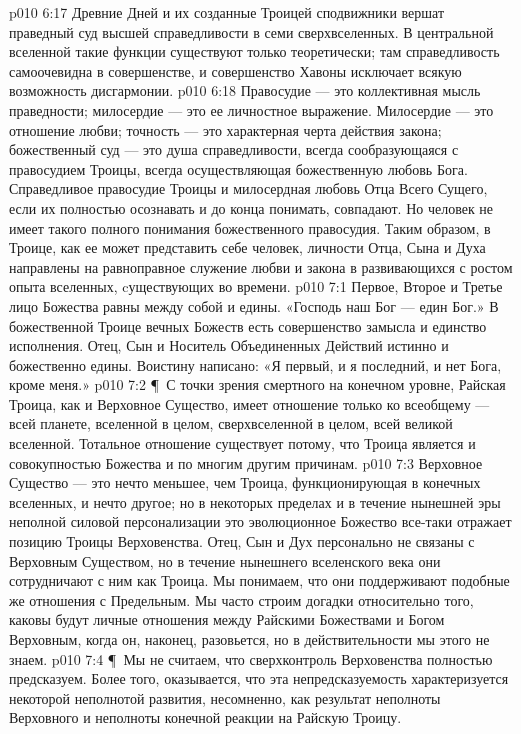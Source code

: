 \vs p010 6:17 Древние Дней и их созданные Троицей сподвижники вершат праведный суд высшей справедливости в семи сверхвселенных. В центральной вселенной такие функции существуют только теоретически; там справедливость самоочевидна в совершенстве, и совершенство Хавоны исключает всякую возможность дисгармонии.
\vs p010 6:18 Правосудие --- это коллективная мысль праведности; милосердие --- это ее личностное выражение. Милосердие --- это отношение любви; точность --- это характерная черта действия закона; божественный суд --- это душа справедливости, всегда сообразующаяся с правосудием Троицы, всегда осуществляющая божественную любовь Бога. Справедливое правосудие Троицы и милосердная любовь Отца Всего Сущего, если их полностью осознавать и до конца понимать, совпадают. Но человек не имеет такого полного понимания божественного правосудия. Таким образом, в Троице, как ее может представить себе человек, личности Отца, Сына и Духа направлены на равноправное служение любви и закона в развивающихся с ростом опыта вселенных, cуществующих во времени.
\vs p010 7:1 Первое, Второе и Третье лицо Божества равны между собой и едины. «Господь наш Бог --- един Бог.» В божественной Троице вечных Божеств есть совершенство замысла и единство исполнения. Отец, Сын и Носитель Объединенных Действий истинно и божественно едины. Воистину написано: «Я первый, и я последний, и нет Бога, кроме меня.»
\vs p010 7:2 \P\ С точки зрения смертного на конечном уровне, Райская Троица, как и Верховное Существо, имеет отношение только ко всеобщему --- всей планете, вселенной в целом, сверхвселенной в целом, всей великой вселенной. Тотальное отношение существует потому, что Троица является и совокупностью Божества и по многим другим причинам.
\vs p010 7:3 Верховное Существо --- это нечто меньшее, чем Троица, функционирующая в конечных вселенных, и нечто другое; но в некоторых пределах и в течение нынешней эры неполной силовой персонализации это эволюционное Божество все\hyp{}таки отражает позицию Троицы Верховенства. Отец, Сын и Дух персонально не связаны с Верховным Существом, но в течение нынешнего вселенского века они сотрудничают с ним как Троица. Мы понимаем, что они поддерживают подобные же отношения с Предельным. Мы часто строим догадки относительно того, каковы будут личные отношения между Райскими Божествами и Богом Верховным, когда он, наконец, разовьется, но в действительности мы этого не знаем.
\vs p010 7:4 \P\ Мы не считаем, что сверхконтроль Верховенства полностью предсказуем. Более того, оказывается, что эта непредсказуемость характеризуется некоторой неполнотой развития, несомненно, как результат неполноты Верховного и неполноты конечной реакции на Райскую Троицу.
